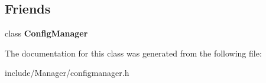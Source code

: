 \subsection*{Friends}
\begin{DoxyCompactItemize}
\item 
\hypertarget{classEngine_1_1InstanceConfig_aed8714396345e5fc5b1a2bf7ccaed500}{}class {\bfseries Config\+Manager}\label{classEngine_1_1InstanceConfig_aed8714396345e5fc5b1a2bf7ccaed500}

\end{DoxyCompactItemize}


The documentation for this class was generated from the following file\+:\begin{DoxyCompactItemize}
\item 
include/\+Manager/configmanager.\+h\end{DoxyCompactItemize}
